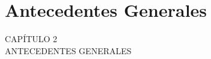 
{

\Hide
\chapter{Antecedentes Generales}
}

\begin{titular} 
	\uppercase{
	capítulo 2 \\
	Antecedentes Generales \\
	}
\end{titular}


